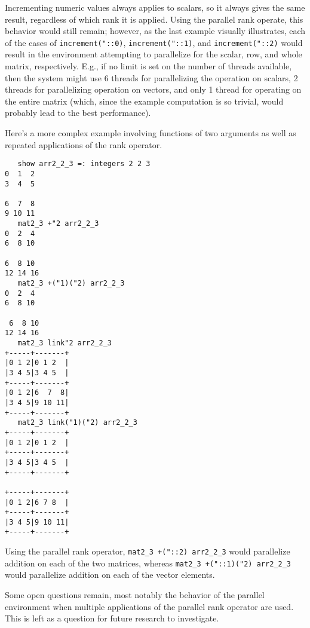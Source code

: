 Incrementing numeric values always applies to scalars, so it always gives the same result, 
regardless of which rank it is applied. 
Using the parallel rank operate, this behavior would still remain; 
however, as the last example visually illustrates, 
each of the cases of \texttt{increment("::0)}, \texttt{increment("::1)}, and \texttt{increment("::2)}
would result in the environment attempting to parallelize for the scalar, row, and whole matrix, respectively.
E.g., if no limit is set on the number of threads available, 
then the system might use 6 threads for parallelizing the operation on scalars, 
2 threads for parallelizing operation on vectors, 
and only 1 thread for operating on the entire matrix 
(which, since the example computation is so trivial, would probably lead to the best performance).

Here's a more complex example involving functions of two arguments 
as well as repeated applications of the rank operator.

\begin{singlespacing}
\begin{small}
\begin{verbatim}
   show arr2_2_3 =: integers 2 2 3
0  1  2
3  4  5

6  7  8
9 10 11
   mat2_3 +"2 arr2_2_3
0  2  4
6  8 10

6  8 10
12 14 16
   mat2_3 +("1)("2) arr2_2_3
0  2  4
6  8 10

 6  8 10
12 14 16
   mat2_3 link"2 arr2_2_3
+-----+-------+
|0 1 2|0 1 2  |
|3 4 5|3 4 5  |
+-----+-------+
|0 1 2|6  7  8|
|3 4 5|9 10 11|
+-----+-------+
   mat2_3 link("1)("2) arr2_2_3
+-----+-------+
|0 1 2|0 1 2  |
+-----+-------+
|3 4 5|3 4 5  |
+-----+-------+

+-----+-------+
|0 1 2|6 7 8  |
+-----+-------+
|3 4 5|9 10 11|
+-----+-------+
\end{verbatim}
\end{small}
\end{singlespacing}


Using the parallel rank operator, 
\texttt{mat2\_3 +("::2) arr2\_2\_3} would parallelize addition on each of the two matrices, whereas
\texttt{mat2\_3 +("::1)("2) arr2\_2\_3} would parallelize addition on each of the vector elements.

Some open questions remain, most notably 
the behavior of the parallel environment when multiple applications of the parallel rank operator are used. 
This is left as a question for future research to investigate.

